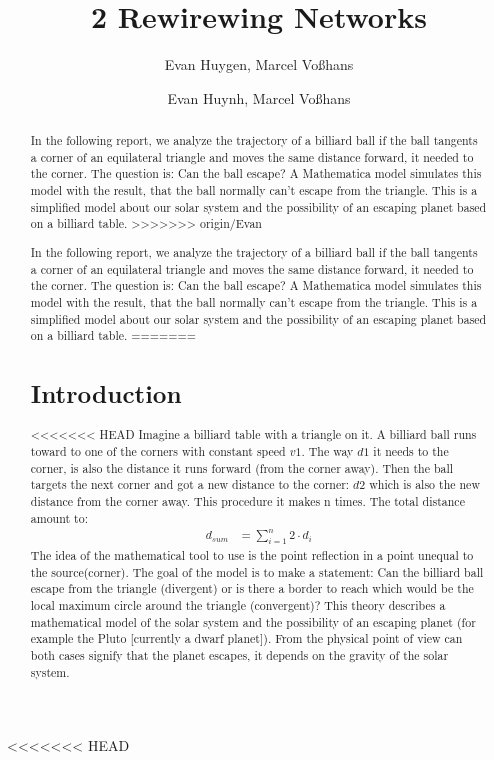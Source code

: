 \documentclass[11pt,a4paper]{article}
\begin{document}
\title{2 Rewirewing Networks}
<<<<<<< HEAD
\author{Evan Huygen, Marcel Vo{\ss}hans}
\maketitle

\begin{abstract}
In the following report, we analyze the trajectory of a billiard ball if the ball tangents a corner of an equilateral triangle and moves the same distance forward, it needed to the corner. The question is: Can the ball escape? A Mathematica model simulates this model with the result, that the ball normally can’t escape from the triangle. This is a simplified model about our solar system and the possibility of an escaping planet based on a billiard table.
=======
\author{Evan Huynh, Marcel Vo{\ss}hans}
\maketitle

\begin{abstract}
In the following report, we analyze the trajectory of a billiard ball if the ball tangents a corner of an equilateral triangle and moves the same distance forward, it needed to the corner. The question is: Can the ball escape? A Mathematica model simulates this model with the result, that the ball normally can't escape from the triangle. This is a simplified model about our solar system and the possibility of an escaping planet based on a billiard table.
>>>>>>> origin/Evan
\end{abstract}

\tableofcontents

\section{Introduction}
<<<<<<< HEAD
Imagine a billiard table with a triangle on it. A billiard ball runs toward to one of the corners with constant speed \(v1\). The way \(d1\) it needs to the corner, is also the distance it runs forward (from the corner away). Then the ball targets the next corner and got a new distance to the corner: \(d2\) which is also the new distance from the corner away. This procedure it makes n times. The total distance amount to:
\begin{align}
d_{sum}&= \sum \limits_{i=1}^n 2 \cdot d_i
\end{align}
The idea of the mathematical tool to use is the point reflection in a point unequal to the source(corner). The goal of the model is to make a statement: Can the billiard ball escape from the triangle (divergent) or is there a border to reach which would be the local maximum circle around the triangle (convergent)? This theory describes a mathematical model of the solar system and the possibility of an escaping planet (for example the Pluto [currently a dwarf planet]). From the physical point of view can both cases signify that the planet escapes, it depends on the gravity of the solar system.

\end{abstract}
\end{document}
